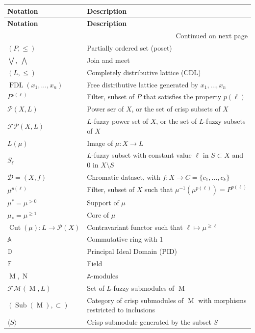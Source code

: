 \documentclass[a4paper,10pt]{article}
\newcommand{\bba}{\mathbb{A}}
\newcommand{\bbd}{\mathbb{D}}
\newcommand{\bbf}{\mathbb{F}}
\newcommand{\calfm}{\mathcal{F\!M}}
\newcommand{\calfp}{\mathcal{FP}}
\newcommand{\calp}{\mathcal{P}}
\DeclareMathOperator{\fdl}{FDL}
\DeclareMathOperator{\cut}{Cut}
\DeclareMathOperator{\sub}{Sub}
\DeclareMathOperator{\Mo}{M}
\DeclareMathOperator{\No}{N}
\begin{document}
\begin{longtable}{l|l}
\toprule
\textbf{Notation} & \textbf{Description} \\
\midrule
\endfirsthead
\toprule
\textbf{Notation} & \textbf{Description} \\
\midrule
\endhead
\midrule
\multicolumn{2}{r}{Continued on next page} \\
\midrule
\endfoot
\bottomrule
\endlastfoot
\((P,\leq)\) & Partially ordered set (poset) \\
\(\bigvee, \; \bigwedge\) & Join and meet \\
\((L,\leq)\) & Completely distributive lattice (CDL) \\
\(\fdl(x_1,\dots,x_n)\) & Free distributive lattice generated by \(x_1,\dots,x_n\) \\
\(P^{p(\ell)}\) & Filter, subset of \(P\) that satisfies the property \(p(\ell)\) \\
\(\calp(X,L)\) & Power ser of \(X\), or the set of crisp subsets of \(X\) \\
\(\calfp(X,L)\) & \(L\)-fuzzy power set of \(X\), or the set of \(L\)-fuzzy subsets of \(X\) \\
\(L(\mu)\) & Image of \(\mu: X \to L\) \\
\(S_{\ell}\) & \(L\)-fuzzy subset with constant value \(\ell\) in \(S \subset X\) and \(0\) in \(X \setminus S\) \\
\(\mathcal{D} = (X,f)\) & Chromatic dataset, with \(f: X \to C = \{c_1,\dots,c_k\}\) \\
\(\mu^{p(\ell)}\) & Filter, subset of \(X\) such that \(\mu^{-1}(\mu^{p(\ell)})=P^{p(\ell)}\) \\
\(\mu^*=\mu^{>0}\) & Support of \(\mu\) \\
\(\mu_*=\mu^{\geq 1}\) & Core of \(\mu\) \\
\(\cut(\mu): L \to \calp(X)\) & Contravariant functor such that \(\ell \mapsto \mu^{\geq \ell}\) \\
\(\bba\) & Commutative ring with \(1\) \\
\(\bbd\) & Principal Ideal Domain (PID) \\
\(\bbf\) & Field \\
\(\Mo, \No\) & \(\bba\)-modules \\
\(\calfm(\Mo,L)\) & Set of \(L\)-fuzzy submodules of \(\Mo\) \\
\((\sub(\Mo),\subset)\) & Category of crisp submodules of \(\Mo\) with morphisms restricted to inclusions \\
\(\langle S \rangle\) & Crisp submodule generated by the subset \(S\) \\

\end{longtable}
\end{document}
